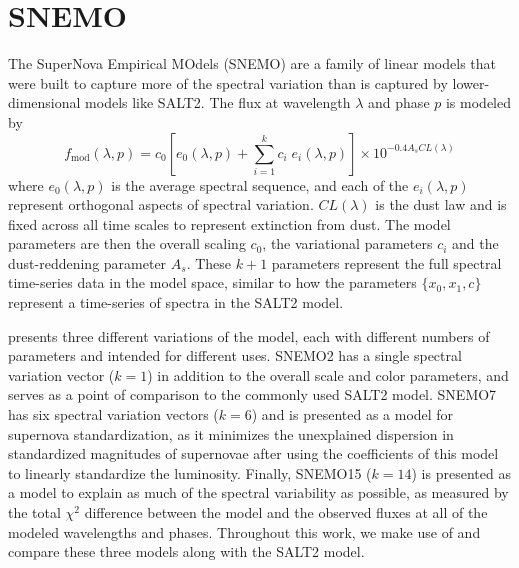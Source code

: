 \section{SNEMO}
\label{sec:snemo}
The SuperNova Empirical MOdels (SNEMO) are a family of linear models that were built to capture more of the spectral variation than is captured by lower-dimensional models like SALT2. The flux at wavelength $\lambda$ and phase $p$ is modeled by
\begin{equation}
    f_\text{mod}(\lambda, p) = c_0 \left[e_0(\lambda, p) + \displaystyle\sum_{i=1}^k c_i\;e_i(\lambda, p)\right] \times 10^{-0.4 A_s CL(\lambda)}
\label{eqn:snemo_flux_model}
\end{equation}
where $e_0(\lambda, p)$ is the average spectral sequence, and each of the $e_i(\lambda, p)$ represent orthogonal aspects of spectral variation. $CL(\lambda)$ is the \cite{Fitzpatrick1999} dust law and is fixed across all time scales to represent extinction from dust. The model parameters are then the overall scaling $c_0$, the variational parameters $c_i$ and the dust-reddening parameter $A_s$. These $k+1$ parameters represent the full spectral time-series data in the model space, similar to how the parameters $\{x_0, x_1, c\}$ represent a time-series of spectra in the SALT2 model.

\cite{Saunders2018} presents three different variations of the model, each with different numbers of parameters and intended for different uses. SNEMO2 has a single spectral variation vector ($k=1$) in addition to the overall scale and color parameters, and serves as a point of comparison to the commonly used SALT2 model. SNEMO7 has six spectral variation vectors ($k=6$) and is presented as a model for supernova standardization, as it minimizes the unexplained dispersion in standardized magnitudes of supernovae after using the coefficients of this model to linearly standardize the luminosity. Finally, SNEMO15 ($k=14$) is presented as a model to explain as much of the spectral variability as possible, as measured by the total $\chi^2$ difference between the model and the observed fluxes at all of the modeled wavelengths and phases. Throughout this work, we make use of and compare these three models along with the SALT2 model.

